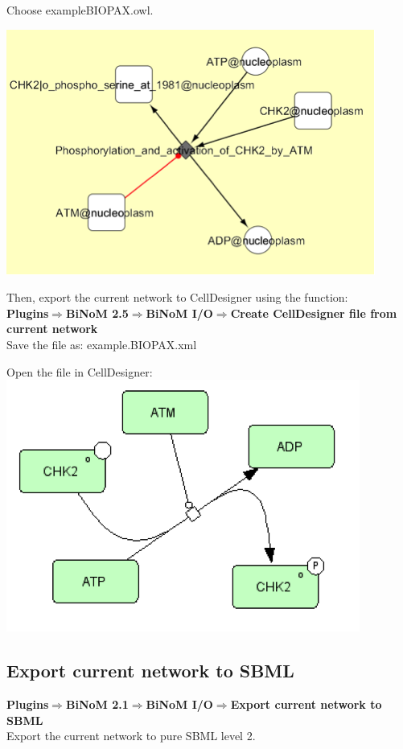 Choose exampleBIOPAX.owl.

\includegraphics{graphics/example_BioPAX.png} 

Then, export the current network to CellDesigner using the function:\\
\textbf{Plugins$\Rightarrow$BiNoM 2.5$\Rightarrow$BiNoM I/O$\Rightarrow$Create CellDesigner file from current network}\\

Save the file as: example.BIOPAX.xml

Open the file in CellDesigner:\\

\includegraphics{graphics/BioPAX_to_CD.png} 



\subsection{Export current network to SBML}
\textbf{Plugins$\Rightarrow$BiNoM 2.1$\Rightarrow$BiNoM I/O$\Rightarrow$Export current network to SBML}\\
Export the current network to pure SBML level 2.


